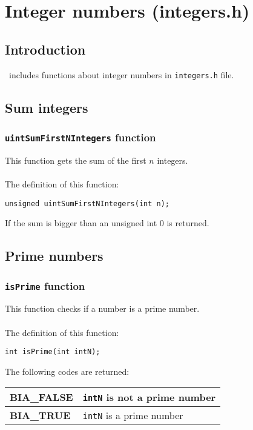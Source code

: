 %
%

\chapter{Integer numbers (integers.h)} \label{ch:integers}

\section{Introduction}

\BI \ includes functions about integer numbers in \texttt{integers.h} file.\\

\section{Sum integers}

\subsection{\texttt{uintSumFirstNIntegers} function} \label{sec:uintSumFirstNIntegers}

This function gets the sum of the first $n$ integers.\\ \\
%
The definition of this function:
%
\begin{verbatim}
unsigned uintSumFirstNIntegers(int n);
\end{verbatim}
%
If the sum is bigger than an unsigned int $0$ is returned.

\section{Prime numbers}

\subsection{\texttt{isPrime} function}

This function checks if a number is a prime number.\\ \\
%
The definition of this function:
%
\begin{verbatim}
int isPrime(int intN);  
\end{verbatim}
%
The following codes are returned:

\begin{center}
\begin{tabular}{|l|l|}
\hline
\textbf{BIA\_FALSE} & \texttt{intN} is not a prime number \\
\hline
\textbf{BIA\_TRUE} & \texttt{intN} is a prime number \\
\hline
\end{tabular}
\end{center}


